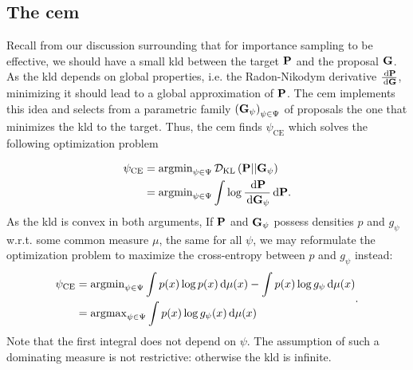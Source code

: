 \subsection{The \texorpdfstring{\Acrfull{cem}}{Cross-Entropy method}}
\label{subsec:cem}
Recall from our discussion surrounding  that for importance sampling to be effective, we should have a small \acrshort{kld} between the target $\P$ and the proposal $\G$. As the \acrshort{kld} depends on global properties, i.e. the Radon-Nikodym derivative $\rnd{\P}{\G}$, minimizing it should lead to a global approximation of $\P$.
The \gls{cem}\citep{Rubinstein1999CrossEntropy,Rubinstein2004CrossEntropy} implements this idea and selects from a parametric family $ \left( \G_{\psi} \right)_{\psi \in \Psi}$ of proposals the one that minimizes the \gls{kld} to the target. Thus, the \acrshort{cem} finds $\psi_{\text{CE}}$ which solves the following optimization problem

\begin{align*}
    \psi_{\text{CE}} &= \argmin_{\psi \in \Psi} \Dkl{\P}{\G_{\psi}} \\
    &= \argmin_{\psi \in \Psi} \int \log \frac{\d \P}{\d\G_{\psi}} \d \P.
\end{align*}
As the \acrshort{kld} is convex in both arguments, 
If $\P$ and $\G_{\psi}$ possess densities $p$ and $g_{\psi}$ w.r.t. some common measure $\mu$, the same for all $\psi$, we may reformulate the optimization problem to maximize the cross-entropy between $p$ and $g_{\psi}$ instead:
\begin{align}
    \begin{split}
    \psi_{\text{CE}} &= \argmin_{\psi \in \Psi} \int  p(x)\log p(x) \d \mu(x) - \int p(x)\log g_{\psi} \d \mu(x) \\ 
    &= \argmax_{\psi \in \Psi} \int p(x) \log g_{\psi}(x) \d \mu(x)
    \end{split} \label{eq:ce_argmax}.
\end{align}
Note that the first integral does not depend on $\psi$. The assumption of such a dominating measure is not restrictive: otherwise the \gls{kld} is infinite. 

